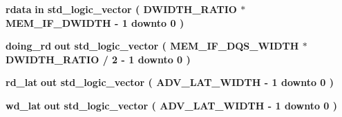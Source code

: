 \begin{DoxyCompactItemize}
\item 
{\bf rdata}  {\bfseries {\bfseries \textcolor{keywordflow}{in}\textcolor{vhdlchar}{ }}} {\bfseries \textcolor{comment}{std\+\_\+logic\+\_\+vector}\textcolor{vhdlchar}{ }\textcolor{vhdlchar}{(}\textcolor{vhdlchar}{ }\textcolor{vhdlchar}{ }\textcolor{vhdlchar}{ }\textcolor{vhdlchar}{ }{\bfseries {\bf D\+W\+I\+D\+T\+H\+\_\+\+R\+A\+T\+IO}} \textcolor{vhdlchar}{$\ast$}\textcolor{vhdlchar}{ }\textcolor{vhdlchar}{ }\textcolor{vhdlchar}{ }{\bfseries {\bf M\+E\+M\+\_\+\+I\+F\+\_\+\+D\+W\+I\+D\+TH}} \textcolor{vhdlchar}{-\/}\textcolor{vhdlchar}{ } \textcolor{vhdldigit}{1} \textcolor{vhdlchar}{ }\textcolor{keywordflow}{downto}\textcolor{vhdlchar}{ }\textcolor{vhdlchar}{ } \textcolor{vhdldigit}{0} \textcolor{vhdlchar}{ }\textcolor{vhdlchar}{)}\textcolor{vhdlchar}{ }} 
\item 
{\bf doing\+\_\+rd}  {\bfseries {\bfseries \textcolor{keywordflow}{out}\textcolor{vhdlchar}{ }}} {\bfseries \textcolor{comment}{std\+\_\+logic\+\_\+vector}\textcolor{vhdlchar}{ }\textcolor{vhdlchar}{(}\textcolor{vhdlchar}{ }\textcolor{vhdlchar}{ }\textcolor{vhdlchar}{ }\textcolor{vhdlchar}{ }{\bfseries {\bf M\+E\+M\+\_\+\+I\+F\+\_\+\+D\+Q\+S\+\_\+\+W\+I\+D\+TH}} \textcolor{vhdlchar}{$\ast$}\textcolor{vhdlchar}{ }\textcolor{vhdlchar}{ }\textcolor{vhdlchar}{ }{\bfseries {\bf D\+W\+I\+D\+T\+H\+\_\+\+R\+A\+T\+IO}} \textcolor{vhdlchar}{/}\textcolor{vhdlchar}{ } \textcolor{vhdldigit}{2} \textcolor{vhdlchar}{-\/}\textcolor{vhdlchar}{ } \textcolor{vhdldigit}{1} \textcolor{vhdlchar}{ }\textcolor{keywordflow}{downto}\textcolor{vhdlchar}{ }\textcolor{vhdlchar}{ } \textcolor{vhdldigit}{0} \textcolor{vhdlchar}{ }\textcolor{vhdlchar}{)}\textcolor{vhdlchar}{ }} 
\item 
{\bf rd\+\_\+lat}  {\bfseries {\bfseries \textcolor{keywordflow}{out}\textcolor{vhdlchar}{ }}} {\bfseries \textcolor{comment}{std\+\_\+logic\+\_\+vector}\textcolor{vhdlchar}{ }\textcolor{vhdlchar}{(}\textcolor{vhdlchar}{ }\textcolor{vhdlchar}{ }\textcolor{vhdlchar}{ }\textcolor{vhdlchar}{ }{\bfseries {\bf A\+D\+V\+\_\+\+L\+A\+T\+\_\+\+W\+I\+D\+TH}} \textcolor{vhdlchar}{-\/}\textcolor{vhdlchar}{ } \textcolor{vhdldigit}{1} \textcolor{vhdlchar}{ }\textcolor{keywordflow}{downto}\textcolor{vhdlchar}{ }\textcolor{vhdlchar}{ } \textcolor{vhdldigit}{0} \textcolor{vhdlchar}{ }\textcolor{vhdlchar}{)}\textcolor{vhdlchar}{ }} 
\item 
{\bf wd\+\_\+lat}  {\bfseries {\bfseries \textcolor{keywordflow}{out}\textcolor{vhdlchar}{ }}} {\bfseries \textcolor{comment}{std\+\_\+logic\+\_\+vector}\textcolor{vhdlchar}{ }\textcolor{vhdlchar}{(}\textcolor{vhdlchar}{ }\textcolor{vhdlchar}{ }\textcolor{vhdlchar}{ }\textcolor{vhdlchar}{ }{\bfseries {\bf A\+D\+V\+\_\+\+L\+A\+T\+\_\+\+W\+I\+D\+TH}} \textcolor{vhdlchar}{-\/}\textcolor{vhdlchar}{ } \textcolor{vhdldigit}{1} \textcolor{vhdlchar}{ }\textcolor{keywordflow}{downto}\textcolor{vhdlchar}{ }\textcolor{vhdlchar}{ } \textcolor{vhdldigit}{0} \textcolor{vhdlchar}{ }\textcolor{vhdlchar}{)}\textcolor{vhdlchar}{ }} 

\end{DoxyCompactItemize}
